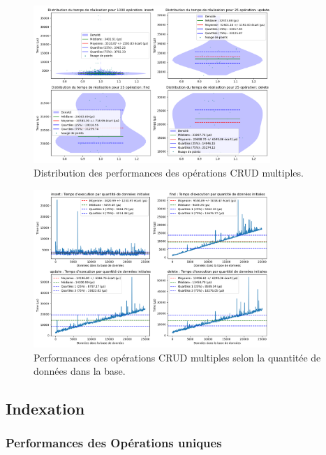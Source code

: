\documentclass[12pt,a4paper]{report}
\begin{document}
        \begin{figure}[H]
            \centering
            \includegraphics[width=0.8\textwidth]{../plots/MySQL/standalone/global_test_many.png}
            \caption{Distribution des performances des opérations CRUD multiples.}
            \label{fig:mysql_standalone_global_many}
        \end{figure}

        \begin{figure}[H]
            \centering
            \includegraphics[width=0.8\textwidth]{../plots/MySQL/standalone/test_many_various_data.png}
            \caption{Performances des opérations CRUD multiples selon la quantitée de données dans la base.}
            \label{fig:mysql_standalone_many_various}
        \end{figure}

        \subsection{Indexation}
        
            \subsubsection{Performances des Opérations uniques}
\end{document}

